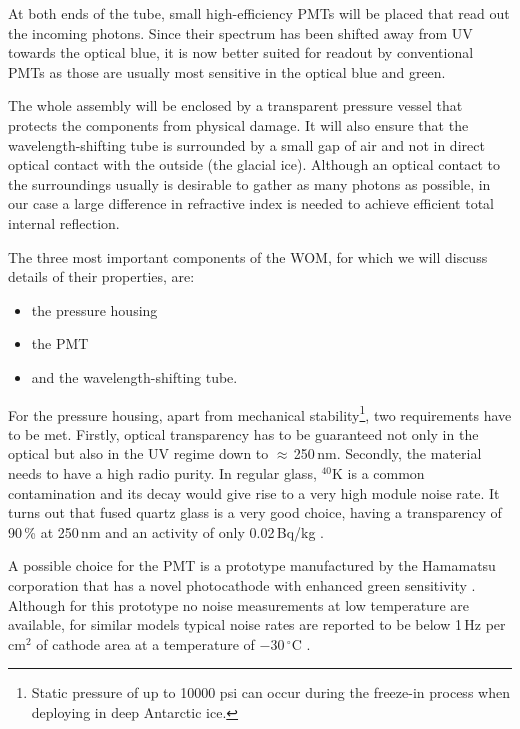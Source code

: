 At both ends of the tube, small high-efficiency PMTs will be placed that read 
out the incoming photons. Since their spectrum has been shifted away from UV 
towards the optical blue, it is now better suited for readout by conventional
PMTs as those are usually most sensitive in the optical blue and green.

The whole assembly will be enclosed by a transparent pressure vessel that 
protects the components from physical damage. It will also ensure that the 
wavelength-shifting tube is surrounded by a small gap of air and not in direct 
optical contact with the outside (\eg the glacial ice). Although an optical 
contact to the surroundings usually is desirable to gather as many photons as 
possible, in our case a large difference in refractive index is needed to
achieve efficient total internal reflection.

The three most important components of the WOM, for which we will discuss 
details of their properties, are:

\begin{itemize}
 \item the pressure housing
 \item the PMT
 \item and the wavelength-shifting tube.
\end{itemize}

For the pressure housing, apart from mechanical stability\footnote{Static 
pressure of up to 10000 psi can occur during the freeze-in process when 
deploying in deep Antarctic ice.}, two requirements have to be met. Firstly, 
optical transparency has to be guaranteed not only in the optical but also in 
the UV regime down to $\approx$\,250\,nm. Secondly, the material needs to have a 
high radio purity. In regular glass, $^{40}$K is a common contamination and its
decay would give rise to a very high module noise rate. It turns out that fused 
quartz glass is a very good choice, having a transparency of 90\,\% at 250\,nm 
and an activity of only 0.02\,Bq/kg \cite{quartzprops}.

A possible choice for the PMT is a prototype manufactured by the Hamamatsu 
corporation that has a novel photocathode with enhanced green sensitivity 
\cite{hamamatsu}. Although for this prototype no noise measurements at low 
temperature are available, for similar models typical noise rates are reported 
to be below 1\,Hz per cm$^2$ of cathode area at a temperature of 
$-30\,^\circ\mathrm{C}$
\cite{meyerPMT}.

